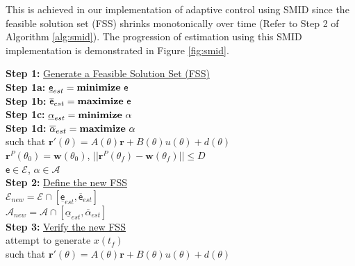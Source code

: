 This is achieved in our implementation of adaptive control using SMID since the feasible solution set (FSS) shrinks monotonically over time (Refer to Step 2 of Algorithm \ref{alg:smid}).
The progression of estimation using this SMID implementation is demonstrated in Figure \ref{fig:smid}.
\begin{algorithm}
    \textbf{Step 1:} \underline{Generate a Feasible Solution Set (FSS)}\\
    \hspace{2em}\textbf{Step 1a: }$\underline{{\mathsf{e}}}_{est} = \text{\textbf{minimize}}\ {\mathsf{e}}$\\
    \hspace{2em}\textbf{Step 1b: }$      \overline{{\mathsf{e}}}_{est} = \text{\textbf{maximize}}\ {\mathsf{e}}$\\
    \hspace{2em}\textbf{Step 1c: }$\underline{\alpha}_{est}   = \text{\textbf{minimize}}\ \alpha$\\
    \hspace{2em}\textbf{Step 1d: }$      \overline{\alpha}_{est}   = \text{\textbf{maximize}}\ \alpha$\\
    \hspace{4em}such that $\boldsymbol{r}'(\theta)=A(\theta)\boldsymbol{r}+B(\theta)u(\theta)+d(\theta)$\\
    \hspace{5em}$\boldsymbol{r}^P(\theta_0)=\boldsymbol{w}(\theta_0)$, $||\boldsymbol{r}^P(\theta_f)-\boldsymbol{w}(\theta_f)||\leq D$\\
    \hspace{5em}${\mathsf{e}}\in{\mathcal{E}}$, $\alpha  \in{\mathcal{A}}$\\
    \textbf{Step 2:} \underline{Define the new FSS}\\
    \hspace{3em}${\mathcal{E}}_{new}={\mathcal{E}}\cap[\underline{{\mathsf{e}}}_{est}, \overline{{\mathsf{e}}}_{est}]$\\
    \hspace{3em}${\mathcal{A}}_{new}={\mathcal{A}}\cap[\underline{\alpha}_{est},   \overline{\alpha}_{est}]$\\
    \textbf{Step 3:} \underline{Verify the new FSS}\\
    \hspace{3em}attempt to generate $x(t_f)$\\
    \hspace{4em}such that $\boldsymbol{r}'(\theta)=A(\theta)\boldsymbol{r}+B(\theta)u(\theta)+d(\theta)$\\

\end{algorithm}

